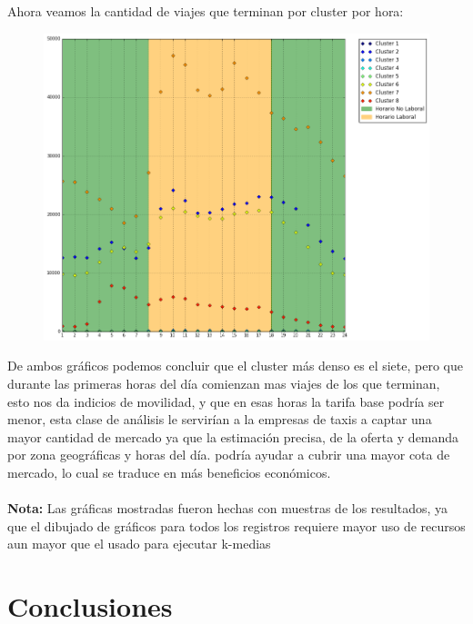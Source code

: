 \documentclass[a4paper]{article}
\begin{document}
 \newpage
 \noindent
 Ahora veamos la cantidad de viajes que terminan por cluster por hora:
 \begin{center}
\begin{figure}[H]
\includegraphics[scale=.4]{descarga_23.png}
\end{figure}
\end{center}

\noindent
De ambos gráficos podemos concluir que el cluster más denso es el siete, pero que durante las primeras horas del día comienzan mas viajes de los que terminan, esto nos da indicios de movilidad, y que en esas horas la tarifa base podría ser menor, esta clase de análisis le servirían a la empresas de taxis a captar una mayor cantidad de mercado ya que la estimación precisa, de la oferta y demanda por zona geográficas y horas del día. podría ayudar a cubrir una mayor cota de mercado, lo cual se traduce en más beneficios económicos.
\\
\\
\textbf{Nota:} Las gráficas mostradas fueron hechas con muestras de los resultados, ya que el dibujado de gráficos para todos los registros requiere mayor uso de recursos aun mayor que el usado para ejecutar k-medias
\section{Conclusiones}
\end{document}
